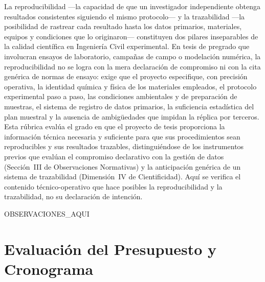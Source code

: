 \documentclass[12pt,a4paper]{report}
\begin{document}
La reproducibilidad ---la capacidad de que un investigador independiente obtenga resultados consistentes siguiendo el mismo protocolo--- y la trazabilidad ---la posibilidad de rastrear cada resultado hasta los datos primarios, materiales, equipos y condiciones que lo originaron--- constituyen dos pilares inseparables de la calidad científica en Ingeniería Civil experimental. En tesis de pregrado que involucran ensayos de laboratorio, campañas de campo o modelación numérica, la reproducibilidad no se logra con la mera declaración de compromiso ni con la cita genérica de normas de ensayo: exige que el proyecto especifique, con precisión operativa, la identidad química y física de los materiales empleados, el protocolo experimental paso a paso, las condiciones ambientales y de preparación de muestras, el sistema de registro de datos primarios, la suficiencia estadística del plan muestral y la ausencia de ambigüedades que impidan la réplica por terceros. Esta rúbrica evalúa el grado en que el proyecto de tesis proporciona la información técnica necesaria y suficiente para que sus procedimientos sean reproducibles y sus resultados trazables, distinguiéndose de los instrumentos previos que evalúan el compromiso declarativo con la gestión de datos (Sección~III de Observaciones Normativas) y la anticipación genérica de un sistema de trazabilidad (Dimensión~IV de Cientificidad). Aquí se verifica el contenido técnico-operativo que hace posibles la reproducibilidad y la trazabilidad, no su declaración de intención.



{{OBSERVACIONES_AQUI}}


\section{Evaluación del Presupuesto y Cronograma}
\end{document}
